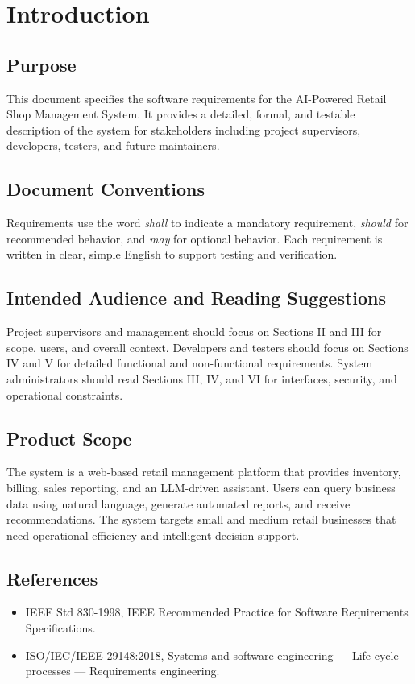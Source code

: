\section{Introduction}
\subsection{Purpose}
This document specifies the software requirements for the AI-Powered Retail Shop Management System. It provides a detailed, formal, and testable description of the system for stakeholders including project supervisors, developers, testers, and future maintainers.

\subsection{Document Conventions}
Requirements use the word \textit{shall} to indicate a mandatory requirement, \textit{should} for recommended behavior, and \textit{may} for optional behavior. Each requirement is written in clear, simple English to support testing and verification.

\subsection{Intended Audience and Reading Suggestions}
Project supervisors and management should focus on Sections II and III for scope, users, and overall context. Developers and testers should focus on Sections IV and V for detailed functional and non-functional requirements. System administrators should read Sections III, IV, and VI for interfaces, security, and operational constraints.

\subsection{Product Scope}
The system is a web-based retail management platform that provides inventory, billing, sales reporting, and an LLM-driven assistant. Users can query business data using natural language, generate automated reports, and receive recommendations. The system targets small and medium retail businesses that need operational efficiency and intelligent decision support.

\subsection{References}
\begin{itemize}
    \item IEEE Std 830-1998, IEEE Recommended Practice for Software Requirements Specifications.
    \item ISO/IEC/IEEE 29148:2018, Systems and software engineering --- Life cycle processes --- Requirements engineering.
\end{itemize}
